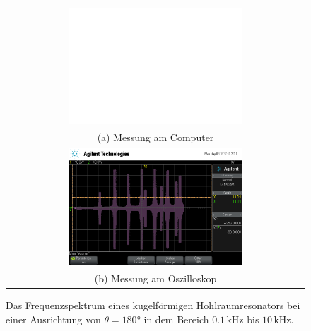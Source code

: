 \begin{figure}
    \centering
    \begin{tabular}{c}
    \includegraphics[width=0.6\textwidth]{Daten/Wasserstoff/H_180.pdf} \\
    (a) Messung am Computer \\[6pt]
    \includegraphics[width=0.6\textwidth]{Daten/Wasserstoff/H_180.png} \\
    (b) Messung am Oszilloskop \\[6pt]
    \end{tabular}
    \caption{Das Frequenzspektrum eines kugelförmigen Hohlraumresonators bei einer Ausrichtung von $\theta = 180\si{°}$ in dem Bereich $0.1 \,\si{\kilo\hertz}$ bis $10 \,\si{\kilo\hertz}$. }
    \label{fig:h180}
\end{figure}


